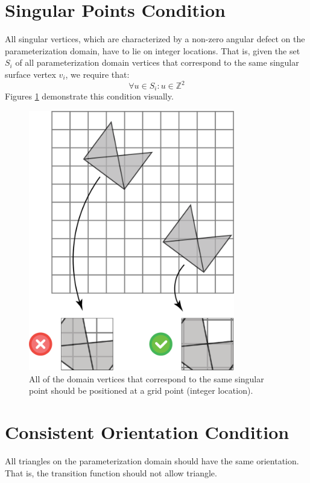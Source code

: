 \section{Singular Points Condition}
All singular vertices, which are characterized by a non-zero angular defect on the parameterization domain, have to lie on integer locations. That is, given the set $S_i$ of all parameterization domain vertices that correspond to the same singular surface vertex $v_i$, we require that:
$$\forall u \in S_i: u \in \mathbb{Z}^2 $$
Figures \ref{fig:singular_points_req} demonstrate this condition visually.
  
\begin{figure}[ht]
\centering
\includegraphics[width=9cm]{figures/singular_points/singularity.png}
\caption[The Singular Points Requirement]{All of the domain vertices that correspond to the same singular point should be positioned at a grid point (integer location).}
\label{fig:singular_points_req}
\end{figure}

\section{Consistent Orientation Condition}
All triangles on the parameterization domain should have the same orientation. That is, the transition function should not allow triangle.

